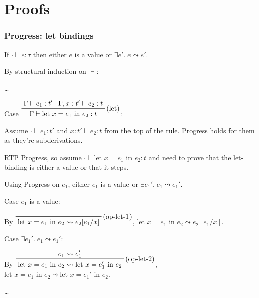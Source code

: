 \documentclass[a4paper,11pt]{article}
\begin{document}
\section{Proofs}
{
    \subsubsection*{Progress: let bindings}
    {
        If \(\cdot \vdash e : \tau\) then either \(e\) is a value or \(\exists e'.\; e \leadsto e'\).

        By structural induction on \(\vdash\):

        \begin{adjustwidth}{5mm}{0mm}
            \dots
    
            Case \(\prftree[r]{(let)}{\Gamma\vdash e_1 : t'}{\Gamma,x:t'\vdash e_2 : t}{\Gamma\vdash \text{let }x =
            e_1 \text{ in } e_2 : t}\):

            \begin{adjustwidth}{5mm}{0mm}
                Assume \(\cdot\vdash e_1 : t'\) and \(x:t' \vdash e_2 : t\) from the top of the rule. Progress holds for
                them as they're subderivations.

                RTP Progress, so assume \(\cdot \vdash \text{let }x = e_1 \text{ in } e_2 : t\) and need to prove that
                the let-binding is either a value or that it steps.
                
                Using Progress on \(e_1\), either \(e_1\) is a value or \(\exists e_1'.\; e_1 \leadsto e_1'\).

                Case \(e_1\) is a value:
                \begin{adjustwidth}{5mm}{0mm}
                    By \(\prftree[r]{(op-let-1)}{\text{let }x = e_1 \text{ in } e_2 \leadsto e_2[e_1/x]}\), \(\text{let
                    }x = e_1 \text{ in } e_2 \leadsto e_2[e_1/x]\).
                \end{adjustwidth}

                Case \(\exists e_1'.\;e_1 \leadsto e_1'\):
                \begin{adjustwidth}{5mm}{0mm}
                    By \(\prftree[r]{(op-let-2)}{e_1 \leadsto e_1'}{\text{let }x = e_1 \text{ in } e_2 \leadsto
                    \text{let }x = e_1' \text{ in } e_2}\), \(\text{let }x = e_1 \text{ in } e_2 \leadsto \text{let }x =
                    e_1' \text{ in } e_2\).
                \end{adjustwidth}
            \end{adjustwidth}

            \dots
        \end{adjustwidth}
    }
}
\end{document}
